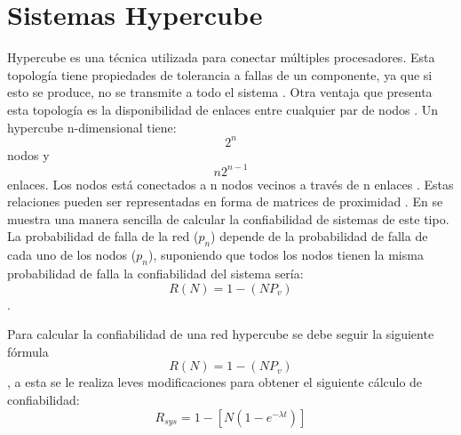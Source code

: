 \section{Sistemas Hypercube}
Hypercube es una técnica utilizada para
conectar múltiples procesadores. Esta topología
tiene propiedades de tolerancia a fallas de un
componente, ya que si esto se produce, no se
transmite a todo el sistema \citep{Rong96}. Otra ventaja que
presenta esta topología es la disponibilidad de
enlaces entre cualquier par de nodos \citep{Mostafa14}. Un
hypercube n-dimensional tiene: $$2^n $$ nodos y $$n2^{n-1}$$ enlaces.
Los nodos está conectados a n nodos vecinos a través de n enlaces \citep{Rong96}. Estas
relaciones pueden ser representadas en forma de matrices de proximidad \citep{Mostafa14}.
En \cite{Mostafa14} se muestra una manera sencilla de calcular la confiabilidad
de sistemas de este tipo. La probabilidad de falla de la red ($p_n$) depende
de la probabilidad de falla de cada uno de los nodos ($p_n$), suponiendo
que todos los nodos tienen la misma probabilidad de falla la confiabilidad
del sistema sería: $$R(N) = 1 -(NP_v)$$.

Para calcular la confiabilidad de una red hypercube se debe seguir
la siguiente fórmula $$R(N) = 1 -(NP_v)$$, a esta se le realiza leves modificaciones
para obtener el siguiente cálculo de confiabilidad: $$ R_{sys} = 1 - [N(1-e^{- \lambda t})]$$

